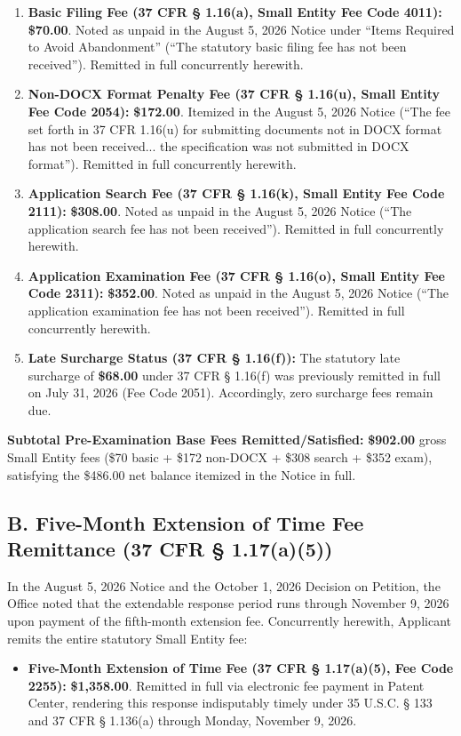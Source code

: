 \documentclass[11pt,letterpaper]{article}
\begin{document}
\begin{enumerate}[leftmargin=*]
    \item \textbf{Basic Filing Fee (37 CFR \S{} 1.16(a), Small Entity Fee Code 4011):} \textbf{\$70.00}. Noted as unpaid in the August 5, 2026 Notice under ``Items Required to Avoid Abandonment'' (``The statutory basic filing fee has not been received''). Remitted in full concurrently herewith.
    
    \item \textbf{Non-DOCX Format Penalty Fee (37 CFR \S{} 1.16(u), Small Entity Fee Code 2054):} \textbf{\$172.00}. Itemized in the August 5, 2026 Notice (``The fee set forth in 37 CFR 1.16(u) for submitting documents not in DOCX format has not been received... the specification was not submitted in DOCX format''). Remitted in full concurrently herewith.
    
    \item \textbf{Application Search Fee (37 CFR \S{} 1.16(k), Small Entity Fee Code 2111):} \textbf{\$308.00}. Noted as unpaid in the August 5, 2026 Notice (``The application search fee has not been received''). Remitted in full concurrently herewith.
    
    \item \textbf{Application Examination Fee (37 CFR \S{} 1.16(o), Small Entity Fee Code 2311):} \textbf{\$352.00}. Noted as unpaid in the August 5, 2026 Notice (``The application examination fee has not been received''). Remitted in full concurrently herewith.

    \item \textbf{Late Surcharge Status (37 CFR \S{} 1.16(f)):} The statutory late surcharge of \textbf{\$68.00} under 37 CFR \S{} 1.16(f) was previously remitted in full on July 31, 2026 (Fee Code 2051). Accordingly, zero surcharge fees remain due.
\end{enumerate}

\noindent\textbf{Subtotal Pre-Examination Base Fees Remitted/Satisfied:} \textbf{\$902.00} gross Small Entity fees (\$70 basic + \$172 non-DOCX + \$308 search + \$352 exam), satisfying the \$486.00 net balance itemized in the Notice in full.

\subsection*{B. Five-Month Extension of Time Fee Remittance (37 CFR \S{} 1.17(a)(5))}
In the August 5, 2026 Notice and the October 1, 2026 Decision on Petition, the Office noted that the extendable response period runs through November 9, 2026 upon payment of the fifth-month extension fee. Concurrently herewith, Applicant remits the entire statutory Small Entity fee:
\begin{itemize}[leftmargin=*]
    \item \textbf{Five-Month Extension of Time Fee (37 CFR \S{} 1.17(a)(5), Fee Code 2255):} \textbf{\$1,358.00}. Remitted in full via electronic fee payment in Patent Center, rendering this response indisputably timely under 35 U.S.C. \S{} 133 and 37 CFR \S{} 1.136(a) through Monday, November 9, 2026.
\end{itemize}
\end{document}
